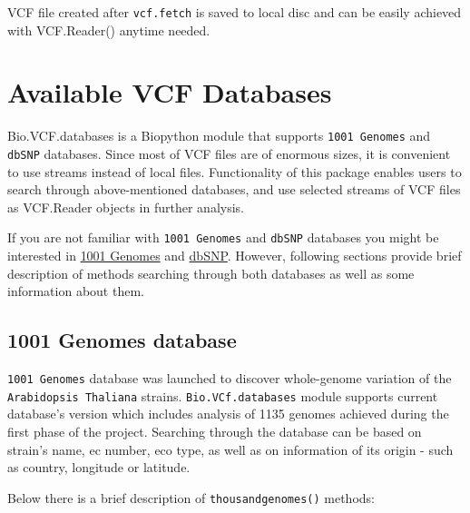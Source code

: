 \noindent VCF file created after \verb|vcf.fetch| is saved to local disc and can be easily achieved with
VCF.Reader() anytime needed.

\section{Available VCF Databases}

\noindent Bio.VCF.databases is a Biopython module that supports \verb|1001 Genomes| and \verb|dbSNP| databases.
Since most of VCF files are of enormous sizes, it is convenient to use streams instead of local files.
Functionality of this package enables users to search through above-mentioned databases, and use selected streams
of VCF files as VCF.Reader objects in further analysis.


\noindent If you are not familiar with \verb|1001 Genomes| and \verb|dbSNP| databases you might be interested in
\href{http://1001genomes.org/}{1001 Genomes} and \href{https://www.ncbi.nlm.nih.gov/SNP/}{dbSNP}. However, following
sections provide brief description of methods searching through both databases as well as some information about them.


\subsection{1001 Genomes database}
\label{sec:object}


\verb|1001 Genomes| database was launched to discover whole-genome variation of the \verb|Arabidopsis Thaliana| strains.
\verb|Bio.VCf.databases| module supports current database's version which includes analysis of 1135 genomes achieved
during the first phase of the project.
Searching through the database can be based on strain's name, ec number, eco type, as well as on information of its
origin - such as country, longitude or latitude.


\noindent Below there is a brief description of \verb|thousandgenomes()| methods:


